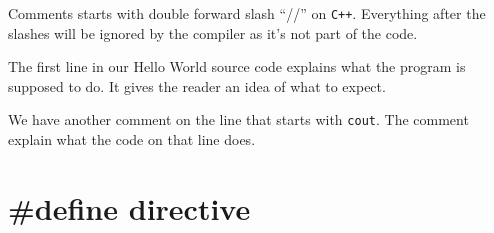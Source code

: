 \documentclass{book}
\begin{document}
Comments starts with double forward slash ``//'' on \verb|C++|. Everything after the slashes will be ignored by the compiler as it's not part of the code.

The first line in our Hello World source code explains what the program is supposed to do. It gives the reader an idea of what to expect.

We have another comment on the line that starts with \verb|cout|. The comment explain what the code on that line does.

\section{\#define directive}
\end{document}
